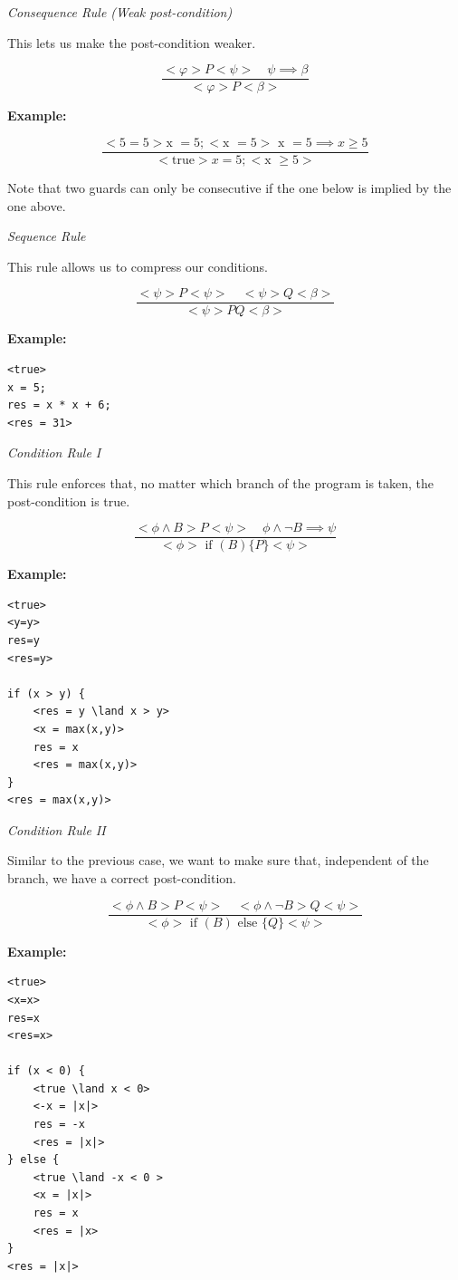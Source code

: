\emph{Consequence Rule (Weak post-condition)} 

This lets us make the post-condition weaker.

\[
    \frac{<\varphi> P <\psi> \quad \psi \implies \beta}{ <\varphi> P <\beta>}
\]

\textbf{Example:} 

\[
    \frac{<5 = 5> \text{x } = 5; <\text{x } = 5> \text{ x } = 5 \implies x \ge 5}{<\text{true}> x = 5; <\text{x } \ge 5>}
\]

Note that two guards can only be consecutive if the one below is implied by the one above. 

\emph{Sequence Rule}

This rule allows us to compress our conditions.

\[
    \frac{<\psi> P <\psi> \quad <\psi> Q <\beta>}{ <\psi> P Q <\beta>}
\]

\textbf{Example:}


\begin{verbatim}
<true> 
x = 5;
res = x * x + 6;
<res = 31>
\end{verbatim}


\emph{Condition Rule I}

This rule enforces that, no matter which branch of the program is taken, the post-condition 
is true.

\[
    \frac{<\phi \land B > P <\psi> \quad \phi \land \neg B \implies \psi}{ <\phi> \text{ if } (B) \{P\} <\psi>}
\]

\textbf{Example:}

\begin{verbatim}
<true>
<y=y>
res=y
<res=y>

if (x > y) {
    <res = y \land x > y>
    <x = max(x,y)>
    res = x 
    <res = max(x,y)>   
}
<res = max(x,y)>
\end{verbatim}

\emph{Condition Rule II}

Similar to the previous case, we want to make sure that, independent of the branch, 
we have a correct post-condition.

\[
    \frac{<\phi \land B > P <\psi> \quad <\phi \land \neg B> Q <\psi>}{ <\phi> \text{ if } (B) \text{ else } \{Q\} <\psi>}
\]

\textbf{Example:}

\begin{verbatim}
<true>
<x=x>
res=x
<res=x>

if (x < 0) {
    <true \land x < 0>
    <-x = |x|>
    res = -x 
    <res = |x|>   
} else {
    <true \land -x < 0 >
    <x = |x|>
    res = x 
    <res = |x>
}
<res = |x|>
\end{verbatim}

